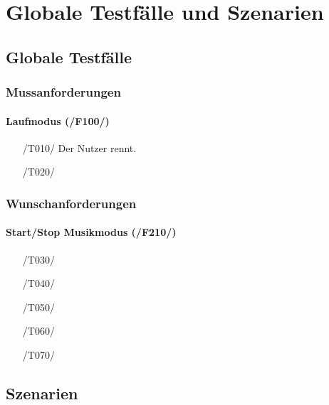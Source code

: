 \documentclass[a4paper,12pt]{article}
\begin{document}
\section{Globale Testfälle und Szenarien}
  \subsection{Globale Testfälle}
    \subsubsection{Mussanforderungen}
    \paragraph{Laufmodus (/F100/)}
    \begin{enumerate}
      \item[/T010/] Der Nutzer rennt.
      \item[/T020/]
    \end{enumerate}

    \subsubsection{Wunschanforderungen}
      \paragraph{Start/Stop Musikmodus (/F210/)}
      \begin{itemize}
        \item[/T030/] 
        \item[/T040/] 
        \item[/T050/] 
        \item[/T060/] 
        \item[/T070/] 
      \end{itemize}
      

  \subsection{Szenarien}
\end{document}
